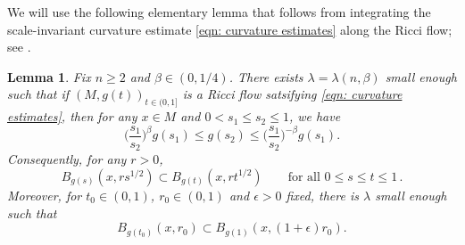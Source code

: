 \documentclass[11pt,reqno]{amsart}
\newtheorem{lemma}[theorem]{Lemma}
\theoremstyle{remark}
\theoremstyle{definition}
\numberwithin{equation}{section}
\newcommand{\e}{{\epsilon}}
\begin{document}
We will use the following elementary lemma that follows from integrating the scale-invariant curvature estimate \eqref{eqn: curvature estimates} along the Ricci flow; see \cite[Lemma 3.8]{LNN1}.
\begin{lemma}\label{lemma: simple}
	Fix $n\geq 2$  and $\beta\in(0,1/4)$. There exists $\lambda=\lambda(n,\beta)$ small enough such that if $(M,g(t))_{t \in (0,1]}$ is a Ricci flow satsifying \eqref{eqn: curvature estimates}, then
	for any $x \in M$  and $0<s_1 \leq s_2 \leq 1$, we have 		
\begin{equation}\label{eqn: bad bound general}
		\Big(\frac{s_1}{s_2}\Big)^\beta g(s_1) \leq g(s_2) \leq \Big(\frac{s_1}{s_2}\Big)^{-\beta} g(s_1).
	\end{equation}
	Consequently, for any $r>0$,  
	\[
	B_{g(s)}(x , r s^{1/2}) \subset B_{g(t) } (x, r t^{1/2}) \qquad \text{for all } 0 \leq s \leq t \leq 1\,.
	\]
	Moreover, for $t_0 \in (0,1)$, $r_0 \in (0,1)$  and $\e>0$ fixed, there is $\lambda$ small enough such that 
	\begin{equation}
		\label{eqn: simple 2}
B_{g(t_0)}(x, r_0) \subset B_{g(1)}\left(x, (1+\e) r_0\right).
		\end{equation}
\end{lemma}
\end{document}
